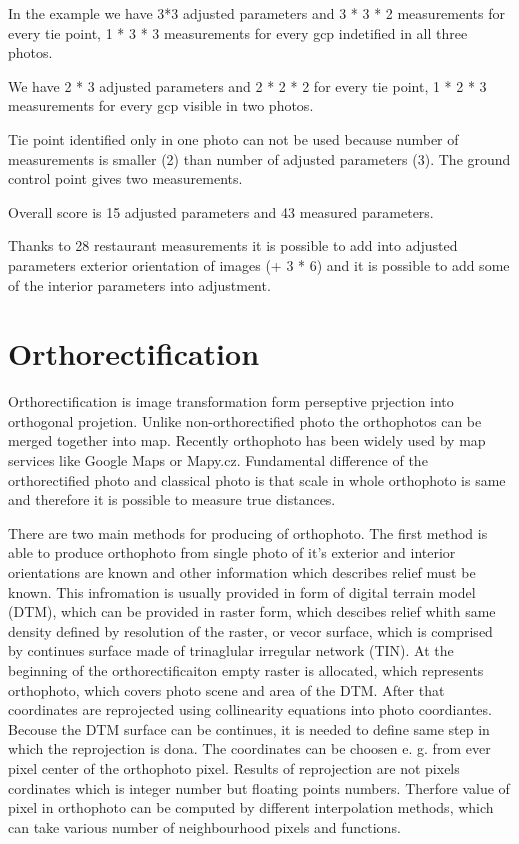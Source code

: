\documentclass[a4paper,12pt]{report}
\begin{document}
In the example we have 3*3 adjusted parameters and 3 * 3 * 2 measurements for every tie point,  
1 * 3 * 3 measurements for every gcp indetified in all three photos. 

We have 2 * 3 adjusted parameters and 2 * 2 * 2 for every tie point,  
1 * 2 * 3 measurements for every gcp visible in two photos.

Tie point identified only in one photo can not be used because number of measurements is smaller (2) than number of adjusted parameters (3).
The ground control point gives two measurements.

Overall score is 15 adjusted parameters and 43 measured parameters.

Thanks to 28 restaurant measurements it is possible to add into adjusted parameters exterior orientation of images (+ 3 * 6) and it is possible to
add some of the interior parameters into adjustment.  

\section{Orthorectification}

Orthorectification is image transformation form perseptive prjection into orthogonal projetion.
Unlike non-orthorectified photo the orthophotos can be merged together into map. Recently 
orthophoto has been widely used by map services like Google Maps or Mapy.cz. Fundamental 
difference of the orthorectified photo and classical photo is that scale in whole orthophoto is same
and therefore it is possible to measure true distances. 


\label{sec:single_ortho}
There are two main methods for producing of orthophoto. The first method is able to produce orthophoto 
from single photo of it's exterior and interior orientations are known and other information which describes
relief must be known. This infromation is usually provided in form of digital terrain model (DTM), which 
can be provided in raster form, which descibes relief whith same density defined by resolution of the raster, 
or vecor surface, which is comprised by continues surface made of trinaglular irregular network (TIN).  
At the beginning of the orthorectificaiton empty raster is allocated, which represents orthophoto, 
which covers photo scene and area of the DTM. After that coordinates are reprojected using collinearity
equations into photo coordiantes. Becouse the DTM surface can be continues, it is needed to define 
same step in which the reprojection is dona. The coordinates can be choosen e. g. from ever pixel center
of the orthophoto pixel. Results of reprojection are not pixels cordinates which is integer number but 
floating points numbers. Therfore value of pixel in orthophoto can be computed by different interpolation methods,
which can take various number of neighbourhood pixels and functions.
\end{document}
